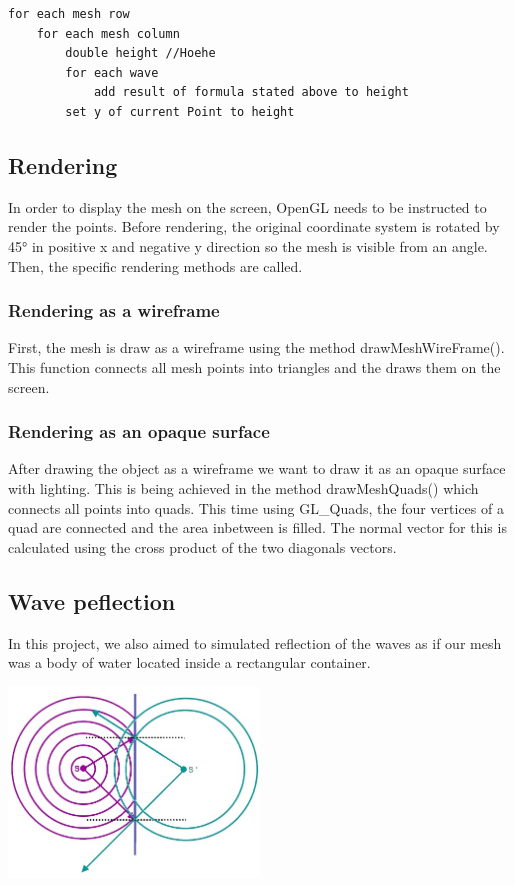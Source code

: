 \documentclass[12pt,a4paper]{scrartcl}
\begin{document}
\begin{lstlisting}[language=PSEUDO]
for each mesh row
	for each mesh column
		double height //Hoehe
		for each wave
			add result of formula stated above to height
		set y of current Point to height
\end{lstlisting}

\subsection{Rendering}
In order to display the mesh on the screen, OpenGL needs to be instructed to render the points. Before rendering, the original coordinate system is rotated by 45° in positive x and negative y direction so the mesh is visible from an angle. Then, the specific rendering methods are called.

\subsubsection{Rendering as a wireframe}
First, the mesh is draw as a wireframe using the method drawMeshWireFrame(). This function connects all mesh points into triangles and the draws them on the screen.

\subsubsection{Rendering as an opaque surface}
After drawing the object as a wireframe we want to draw it as an opaque surface with lighting. This is being achieved in the method drawMeshQuads() which connects all points into quads. This time using GL_Quads, the four vertices of a quad are connected and the area inbetween is filled. The normal vector for this is calculated using the cross product of the two diagonals vectors.

\subsection{Wave peflection}
In this project, we also aimed to simulated reflection of the waves as if our mesh was a body of water located inside a rectangular container.

\begin{center}
	\includegraphics[width=0.5\textwidth]{Images/Reflection.jpg}
\end{center}
\end{document}
